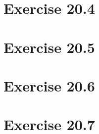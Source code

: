 \documentclass[11pt]{article}
\begin{document}
\section*{Exercise 20.4}
\section*{Exercise 20.5}
\section*{Exercise 20.6}
\section*{Exercise 20.7}
%


\end{document}
